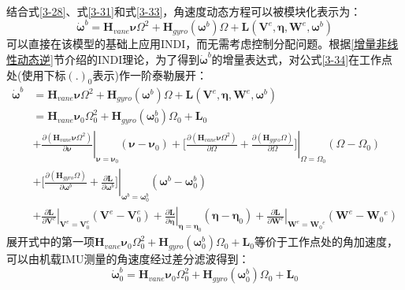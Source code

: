 结合式\eqref{3-28}、式\eqref{3-31}和式\eqref{3-33}，角速度动态方程可以被模块化表示为：
\begin{equation}
    \boldsymbol{\dot{\omega}}^b=\boldsymbol{H}_{vane}\boldsymbol{\nu}\Omega^2+\boldsymbol{H}_{gyro}(\boldsymbol{\omega}^b)\Omega+\boldsymbol{L}(\boldsymbol{V}^e,\boldsymbol{\eta},\boldsymbol{W}^e,\boldsymbol{\omega}^b)
    \label{3-34}
\end{equation}
可以直接在该模型的基础上应用INDI，而无需考虑控制分配问题。根据\ref{增量非线性动态逆}节介绍的INDI理论，为了得到$\boldsymbol{\dot{\omega}}^b$的增量表达式，对公式\eqref{3-34}在工作点处(使用下标$(.)_0$表示)作一阶泰勒展开：
\begin{equation}
    \begin{aligned}
    \boldsymbol{\dot{\omega}}^b&=\boldsymbol{H}_{vane}\boldsymbol{\nu}\Omega^2+\boldsymbol{H}_{gyro}(\boldsymbol{\omega}^b)\Omega+\boldsymbol{L}(\boldsymbol{V}^e,\boldsymbol{\eta},\boldsymbol{W}^e,\boldsymbol{\omega}^b)\\
    &=\boldsymbol{H}_{vane}\boldsymbol{\nu}_0\Omega_0^2+\boldsymbol{H}_{gyro}(\boldsymbol{\omega}_0^b)\Omega_0+\boldsymbol{L}_0\\
    & +\left.\frac{\partial(\boldsymbol{H}_{vane}\boldsymbol{\nu}\Omega^2)}{\partial\boldsymbol{\nu}}\right|_{\boldsymbol{\nu}=\boldsymbol{\nu}_0}(\boldsymbol{\nu}-\boldsymbol{\nu}_0)
    +\left.\bigg[\frac{\partial(\boldsymbol{H}_{vane}\boldsymbol{\nu}\Omega^2)}{\partial\Omega}+\frac{\partial(\boldsymbol{H}_{gyro}\Omega)}{\partial\Omega}\bigg]\right|_{\Omega=\Omega_0}
    (\Omega-\Omega_0) \\
     & +\left.\bigg[\frac{\partial(\boldsymbol{H}_{gyro}\Omega)}{\partial\boldsymbol{\omega}^{b}}+\frac{\partial\boldsymbol{L}}{\partial\boldsymbol{\omega}^{b}}\bigg]\right|_{\boldsymbol{\omega}^{b}=\boldsymbol{\omega}_{0}^{b}}(\boldsymbol{\omega}^{b}-\boldsymbol{\omega}_{0}^{b})\\
    & +\left.\frac{\partial\boldsymbol{L}}{\partial\boldsymbol{V}^{e}}\right|_{\boldsymbol{V}^{e}=\boldsymbol{V}_{0}^{e}}
    (\boldsymbol{V}^{e}-\boldsymbol{V}_{0}^{e})
    +\left.\frac{\partial\boldsymbol{L}}{\partial\boldsymbol{\eta}}\right|_{\boldsymbol{\eta}=\boldsymbol{\eta}_{0}}(\boldsymbol{\eta}-\boldsymbol{\eta}_{0})
    +\left. \frac{\partial\boldsymbol{L}}{\partial\boldsymbol{W}^e}\right|_{\boldsymbol{W}^e=\boldsymbol{W}_0{}^e}(\boldsymbol{W}^e-\boldsymbol{W}_0{}^e)
    \end{aligned}
    \label{3-35}
\end{equation}
展开式中的第一项$\boldsymbol{H}_{vane}\boldsymbol{\nu}_0\Omega_0^2+\boldsymbol{H}_{gyro}(\boldsymbol{\omega}_0^b)\Omega_0+\boldsymbol{L}_0$等价于工作点处的角加速度，可以由机载IMU测量的角速度经过差分滤波得到：
\begin{equation}
    \boldsymbol{\dot{\omega}}^b_0=\boldsymbol{H}_{vane}\boldsymbol{\nu}_0\Omega_0^2+\boldsymbol{H}_{gyro}(\boldsymbol{\omega}_0^b)\Omega_0+\boldsymbol{L}_0
    \label{3-36}
\end{equation}


